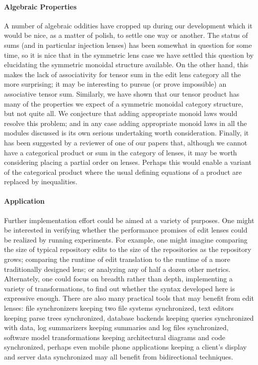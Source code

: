 \paragraph*{Algebraic Properties}
A number of algebraic oddities have cropped up during our development which
it would be nice, as a matter of polish, to settle one way or another. The
status of sums (and in particular injection lenses) has been somewhat in
question for some time, so it is nice that in the symmetric lens case we
have settled this question by elucidating the symmetric monoidal structure
available. On the other hand, this makes the lack of associativity for
tensor sum in the edit lens category all the more surprising; it may be
interesting to pursue (or prove impossible) an associative tensor sum.
Similarly, we have shown that our tensor product has many of the properties
we expect of a symmetric monoidal category structure, but not quite all. We
conjecture that adding appropriate monoid laws would resolve this problem;
and in any case adding appropriate monoid laws in all the modules discussed
is its own serious undertaking worth consideration. Finally, it has been
suggested by a reviewer of one of our papers that, although we cannot have a
categorical product or sum in the category of lenses, it may be worth
considering placing a partial order on lenses. Perhaps this would enable a
variant of the categorical product where the usual defining equations of a
product are replaced by inequalities.

\paragraph*{Application}
Further implementation effort could be aimed at a variety of purposes.
One might be interested in verifying whether the performance promises of
edit lenses could be realized by running experiments. For example, one might
imagine comparing the size of typical repository edits to the size of the
repositories as the repository grows; comparing the runtime of edit
translation to the runtime of a more traditionally designed lens; or
analyzing any of half a dozen other metrics. Alternately, one could focus on
breadth rather than depth, implementing a variety of transformations, to
find out whether the syntax developed here is expressive enough. There are
also many practical tools that may benefit from edit lenses: file
synchronizers keeping two file systems synchronized, text editors keeping
parse trees synchronized, database backends keeping queries synchronized
with data, log summarizers keeping summaries and log files synchronized,
software model transformations keeping architectural diagrams and code
synchronized, perhaps even mobile phone applications keeping a client's
display and server data synchronized may all benefit from bidirectional
techniques.

